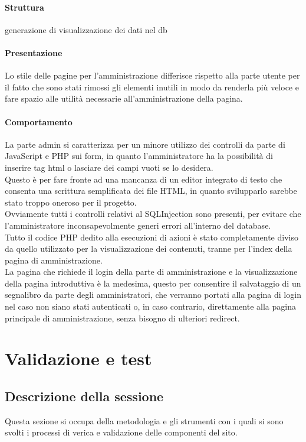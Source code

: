 \documentclass[openany, a4paper, 12pt]{report}
\begin{document}
		\subsubsection{Struttura}
		generazione di visualizzazione dei dati nel db
		\subsubsection{Presentazione}
		Lo stile delle pagine per l'amministrazione differisce rispetto alla parte utente per il fatto che sono stati rimossi gli elementi inutili in modo da renderla più veloce e fare spazio alle utilità necessarie all'amministrazione della pagina.
		\subsubsection{Comportamento}
		La parte admin si caratterizza per un minore utilizzo dei controlli da parte di JavaScript e PHP sui form, in quanto l'amministratore ha la possibilità di inserire tag html o lasciare dei campi vuoti se lo desidera.\\
		Questo è per fare fronte ad una mancanza di un editor integrato di testo che consenta una scrittura semplificata dei file HTML, in quanto svilupparlo sarebbe stato troppo oneroso per il progetto.\\
		Ovviamente tutti i controlli relativi al SQLInjection sono presenti, per evitare che l'amministratore inconsapevolmente generi errori all'interno del database.\\
		Tutto il codice PHP dedito alla esecuzioni di azioni è stato completamente diviso da quello utilizzato per la visualizzazione dei contenuti, tranne per l'index della pagina di amministrazione.\\
		La pagina che richiede il login della parte di amministrazione e la visualizzazione della pagina introduttiva è la medesima, questo per consentire il salvataggio di un segnalibro da parte degli amministratori, che verranno portati alla pagina di login nel caso non siano stati autenticati o, in caso contrario, direttamente alla pagina principale di amministrazione, senza bisogno di ulteriori redirect.
	
	\chapter{Validazione e test}
		\section{Descrizione della sessione}
			Questa sezione si occupa della metodologia e gli strumenti con i quali si sono svolti i processi di verica e validazione delle componenti del sito.
\end{document}
